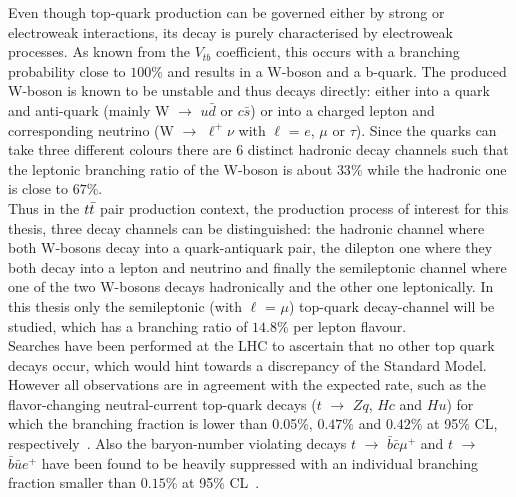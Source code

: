 Even though top-quark production can be governed either by strong or electroweak interactions, its decay is purely characterised by electroweak processes. As known from the $V_{tb}$ coefficient, this occurs with a branching probability close to $100\%$ and results in a W-boson and a b-quark. 
The produced W-boson is known to be unstable and thus decays directly: either into a quark and anti-quark (mainly W $\rightarrow$ $u\bar{d}$ or $c\bar{s}$) or into a charged lepton and corresponding neutrino (W $\rightarrow$ $\ell^{+}\nu$ with $\ell$ = $e$, $\mu$ or $\tau$).
Since the quarks can take three different colours there are 6 distinct hadronic decay channels such that the leptonic branching ratio of the W-boson is about $33\%$ while the hadronic one is close to $67\%$. %
\\
Thus in the $t\bar{t}$ pair production context, the production process of interest for this thesis, three decay channels can be distinguished: the hadronic channel where both W-bosons decay into a quark-antiquark pair, the dilepton one where they both decay into a lepton and neutrino and finally the semileptonic channel where one of the two W-bosons decays hadronically and the other one leptonically. 
In this thesis only the semileptonic (with $\ell$ = $\mu$) top-quark decay-channel will be studied, which has a branching ratio of $14.8\%$ per lepton flavour.
\\

Searches have been performed at the LHC to ascertain that no other top quark decays occur, which would hint towards a discrepancy of the Standard Model. However all observations are in agreement with the expected rate, such as the flavor-changing neutral-current top-quark decays ($t$ $\rightarrow$ $Zq$, $Hc$ and $Hu$) for which the branching fraction is lower than 0.05$\%$, $0.47\%$ and $0.42\%$ at 95$\%$ CL, respectively~\cite{CMStZqDecayBR, CMStHqDecayBR}. Also the baryon-number violating decays $t$ $\rightarrow$ $\bar{b}\bar{c}\mu^{+}$ and $t$ $\rightarrow$ $\bar{b}\bar{u} e^{+}$ have been found to be heavily suppressed with an individual branching fraction smaller than $0.15\%$ at 95\% CL~\cite{CMSBNVDecayBR}.
\\

